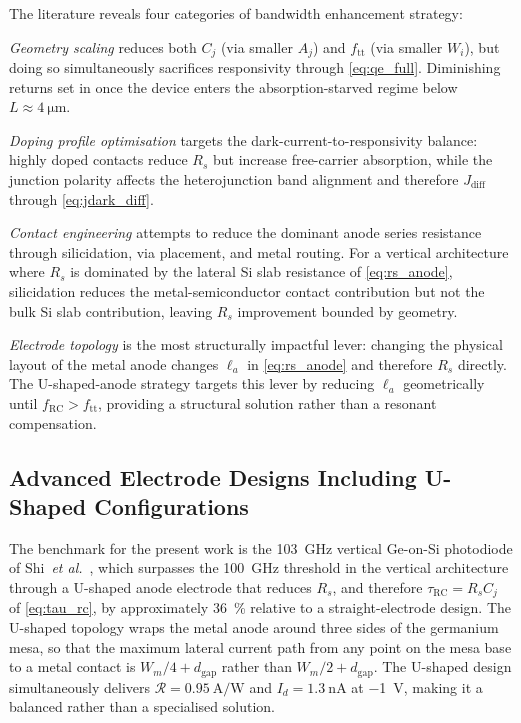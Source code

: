 The literature reveals four categories of bandwidth enhancement strategy:

\emph{Geometry scaling} reduces both $C_j$ (via smaller $A_j$) and $f_{\mathrm{tt}}$
(via smaller $W_i$), but doing so simultaneously sacrifices responsivity through
\cref{eq:qe_full}. Diminishing returns set in once the device enters the
absorption-starved regime below $L\approx\SI{4}{\micro\metre}$.

\emph{Doping profile optimisation} targets the dark-current-to-responsivity
balance: highly doped contacts reduce $R_s$ but increase free-carrier absorption,
while the junction polarity affects the heterojunction band alignment and
therefore $J_{\mathrm{diff}}$ through \cref{eq:jdark_diff}.

\emph{Contact engineering} attempts to reduce the dominant anode series resistance
through silicidation, via placement, and metal routing. For a vertical architecture
where $R_s$ is dominated by the lateral Si slab resistance of \cref{eq:rs_anode},
silicidation reduces the metal-semiconductor contact contribution but not the bulk
Si slab contribution, leaving $R_s$ improvement bounded by geometry.

\emph{Electrode topology} is the most structurally impactful lever: changing the
physical layout of the metal anode changes $\ell_a$ in \cref{eq:rs_anode} and
therefore $R_s$ directly. The U-shaped-anode strategy targets this lever by
reducing $\ell_a$ geometrically until $f_{\mathrm{RC}}>f_{\mathrm{tt}}$, providing
a structural solution rather than a resonant compensation.

\subsection[Advanced Electrode Designs Including U-Shaped Configurations]{Advanced
Electrode Designs Including U-Shaped Configurations}
\label{subsec:pd_u_electrode_review}

The benchmark for the present work is the \SI{103}{\giga\hertz} vertical Ge-on-Si
photodiode of Shi~\textit{et al.}~\cite{Shi2024}, which surpasses the
\SI{100}{\giga\hertz} threshold in the vertical architecture through a U-shaped
anode electrode that reduces $R_s$, and therefore $\tau_{\mathrm{RC}}=R_sC_j$ of
\cref{eq:tau_rc}, by approximately \SI{36}{\percent} relative to a
straight-electrode design. The U-shaped topology wraps the metal anode around
three sides of the germanium mesa, so that the maximum lateral current path from
any point on the mesa base to a metal contact is $W_m/4+d_{\mathrm{gap}}$ rather
than $W_m/2+d_{\mathrm{gap}}$. The U-shaped design simultaneously delivers
$\mathcal{R}=\SI{0.95}{\ampere\per\watt}$ and $I_d=\SI{1.3}{\nano\ampere}$ at
\SI{-1}{\volt}, making it a balanced rather than a specialised solution.

